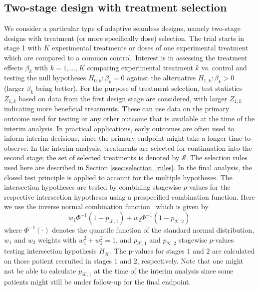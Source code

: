 \documentclass[bimj,fleqn]{w-art}
\theoremstyle{plain}
\theoremstyle{definition}
\begin{document}
\subsection{Two-stage design with treatment selection}
\label{ssec:two_stage_design_with_treatment_selection}
We consider a particular type of adaptive seamless designs, namely two-stage designs with treatment (or more specifically dose) selection. The trial starts in stage 1 with $K$ experimental treatments or doses of one experimental treatment which are compared to a common control. Interest is in assessing the treatment effects $\beta_k$ with $k=1,\dots, K$ comparing experimental treatment $k$ vs. control and testing the null hypotheses $H_{0,k}: \beta_k=0$ against the alternative  $H_{1,k}: \beta_k>0$ (larger $\beta_k$ being better). For the purpose of treatment selection, test statistics $Z_{1,k}$ based on data from the first design stage are considered, with larger $Z_{1,k}$ indicating more beneficial treatments. These can use data on the primary outcome used for testing or any other outcome that is available at the time of the interim analysis. In practical applications, early outcomes are often used to inform interim decisions, since the primary endpoint might take a longer time to observe. In the interim analysis, treatments are selected for continuation into the second stage; the set of selected treatments is denoted by $\mathcal{S}$. The selection rules used here are described in Section \ref{ssec:selection_rules}. In the final analysis, the closed test principle is applied to account for the multiple hypotheses. The intersection hypotheses are tested by combining stagewise $p$-values for the respective intersection hypotheses using a prespecified combination function. Here we use the inverse normal combination function~\citep{lehmacher_adaptive_1999} which is given by
\begin{equation}
   w_1 \Phi^{-1}(1-p_{\mathcal{K},1}) + w_2 \Phi^{-1}(1-p_{\mathcal{K},2}) \,
\end{equation}
where $\Phi^{-1}(\cdot)$ denotes the quantile function of the standard normal distribution, $w_1$ and $w_2$ weights with $w_1^2+w_2^2 = 1$, and $p_{\mathcal{K},1}$ and $p_{\mathcal{K},2}$ stagewise $p$-values testing intersection hypothesis $H_{\mathcal{K}}$. The p-values for stages $1$ and $2$ are calculated on those patient recruited in stages $1$ and $2$, respectively. Note that one might not be able to calculate $p_{\mathcal{K},1}$ at the time of the interim analysis since some patients might still be under follow-up for the final endpoint.
\end{document}
